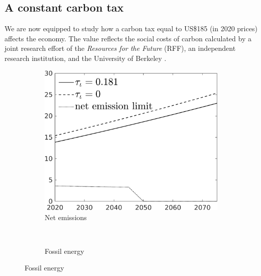 \subsection{A constant carbon tax}\label{subsec:exp}


We are now equipped to study how a carbon tax  equal to US\$185 (in 2020 prices) affects the economy. The value reflects the social costs of carbon calculated by a joint research effort of the \textit{Resources for the Future} (RFF), an independent research institution, and the University of Berkeley \citep{Rennert2022ComprehensiveCO2}. 


\begin{figure}[h!!]
	\centering
	\caption{Effect of a constant carbon tax equal to 185\$ per ton of carbon  }\label{fig:Leveltauf_nsk0_xgr0_know}		
\begin{subfigure}[]{0.4\textwidth}
	\caption{Net emissions}
	\includegraphics[width=1\textwidth]{../../codding_model/own_basedOnFried/optimalPol_010922_revision/figures/all_13Sept22/CompTauf_bytaul_Reg5_Emnet_spillover0_nsk0_xgr0_knspil0_sep0_LFlimit0_emsbase0_countec0_GovRev0_etaa0.79_lgd1.png}
\end{subfigure}	
 \begin{minipage}[]{0.1\textwidth}
	\
\end{minipage}
\begin{subfigure}[]{0.4\textwidth}
\caption{Fossil energy}

\end{subfigure}
\end{figure}
